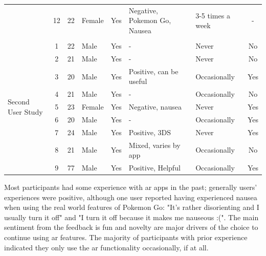 \documentclass[thesis]{fputhesis}
\begin{document}
\begin{body}
\begin{table}[h!]
{\begin{tabular}{@{}lcclcllc@{}}
        & 12 & 22 & Female & Yes & Negative, Pokemon Go, Nausea & 3-5 times a week      &   -   \\  
    \\
    \multirow[t]{9}{.25\textwidth}{Second User Study}
        & 1  & 22 & Male   & Yes & -                       & Never                      & No    \\ 
        & 2  & 21 & Male   & Yes & -                       & Never                      & No    \\ 
        & 3  & 20 & Male   & Yes & Positive, can be useful & Occasionally               & Yes   \\ 
        & 4  & 21 & Male   & Yes & -                       & Occasionally               & No    \\ 
        & 5  & 23 & Female & Yes & Negative, nausea        & Never                      & Yes   \\ 
        & 6  & 20 & Male   & Yes & -                       & Occasionally               & Yes   \\ 
        & 7  & 24 & Male   & Yes & Positive, 3DS           & Never                      & Yes   \\ 
        & 8  & 21 & Male   & Yes & Mixed, varies by app    & Occasionally               & No    \\ 
        & 9  & 77 & Male   & Yes & Positive, Helpful       & Occasionally               & Yes   \\ 
    \end{tabular}%
}
\end{table}
\newpage

Most participants had some experience with \acrshort{ar} apps in the past; generally users' experiences were positive, although one user reported having experienced nausea when using the real world features of Pokemon Go: "It's rather disorienting and I usually turn it off" and "I turn it off because it makes me nauseous :(". The main sentiment from the feedback is fun and novelty are major drivers of the choice to continue using \acrshort{ar} features. The majority of participants with prior experience indicated they only use the \acrshort{ar} functionality occasionally, if at all.


\end{body}
\end{document}
